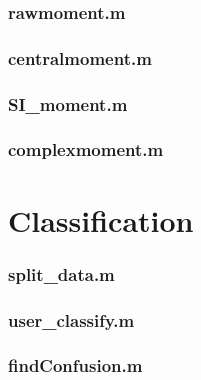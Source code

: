\subsubsection*{\hypertarget{rawmoment}{rawmoment.m}}


\subsubsection*{\hypertarget{centralmoment}{centralmoment.m}}


\subsubsection*{\hypertarget{simoment}{SI\_moment.m}}


\subsubsection*{\hypertarget{complex}{complexmoment.m}}


\newpage
\section{Classification}
\subsubsection*{\hypertarget{splitdata}{split\_data.m}}


\subsubsection*{\hypertarget{userclf}{user\_classify.m}}


\subsubsection*{\hypertarget{findconf}{findConfusion.m}}



